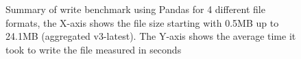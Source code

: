 \begin{figure}[H]%
    \centering
    \qquad
    \caption{Summary of write benchmark using Pandas for 4 different file formats, the X-axis shows the file size starting with 0.5MB up to 24.1MB (aggregated v3-latest). The Y-axis shows the average time it took to write the file measured in seconds}%
    \label{fig:write_benchmark_summary}%
\end{figure}

